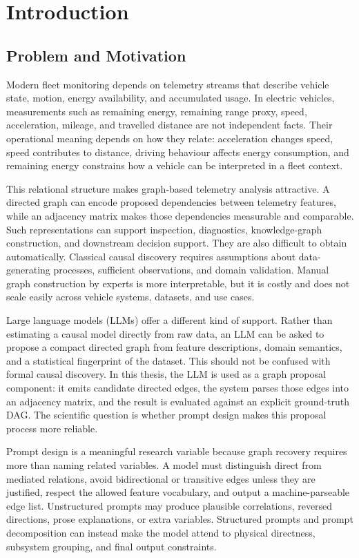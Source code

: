 \chapter{Introduction}
\label{sec:introduction}

\section{Problem and Motivation}

Modern fleet monitoring depends on telemetry streams that describe vehicle
state, motion, energy availability, and accumulated usage. In electric
vehicles, measurements such as remaining energy, remaining range proxy, speed,
acceleration, mileage, and travelled distance are not independent facts. Their
operational meaning depends on how they relate: acceleration changes speed,
speed contributes to distance, driving behaviour affects energy consumption,
and remaining energy constrains how a vehicle can be interpreted in a fleet
context.

This relational structure makes graph-based telemetry analysis attractive. A
directed graph can encode proposed dependencies between telemetry features,
while an adjacency matrix makes those dependencies measurable and comparable.
Such representations can support inspection, diagnostics, knowledge-graph
construction, and downstream decision support. They are also difficult to
obtain automatically. Classical causal discovery requires assumptions about
data-generating processes, sufficient observations, and domain validation.
Manual graph construction by experts is more interpretable, but it is costly
and does not scale easily across vehicle systems, datasets, and use cases.

Large language models (LLMs) offer a different kind of support. Rather than
estimating a causal model directly from raw data, an LLM can be asked to
propose a compact directed graph from feature descriptions, domain semantics,
and a statistical fingerprint of the dataset. This should not be confused with
formal causal discovery. In this thesis, the LLM is used as a graph proposal
component: it emits candidate directed edges, the system parses those edges
into an adjacency matrix, and the result is evaluated against an explicit
ground-truth DAG. The scientific question is whether prompt design makes this
proposal process more reliable.

Prompt design is a meaningful research variable because graph recovery
requires more than naming related variables. A model must distinguish direct
from mediated relations, avoid bidirectional or transitive edges unless they
are justified, respect the allowed feature vocabulary, and output a
machine-parseable edge list. Unstructured prompts may produce plausible
correlations, reversed directions, prose explanations, or extra variables.
Structured prompts and prompt decomposition can instead make the model attend
to physical directness, subsystem grouping, and final output constraints.

